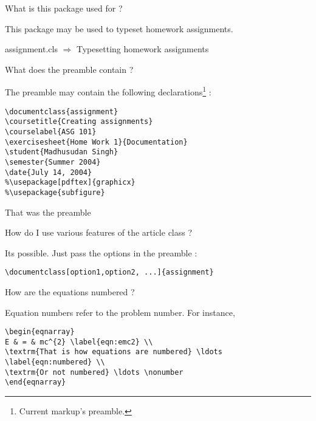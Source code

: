 \documentclass{assignment}
\date{July 14, 2004}
\begin{document}
\begin{problemlist}
\pbitem What is this package used for ?

\begin{problem}

This package may be used to typeset homework assignments.

\begin{answer}
assignment.cls $\Rightarrow$ Typesetting homework assignments
\end{answer}

\end{problem}

\pbitem What does the preamble contain ?
\begin{problem}

The preamble may contain the following declarations\footnote{Current markup's preamble.} :

\begin{verbatim}
\documentclass{assignment}
\coursetitle{Creating assignments}
\courselabel{ASG 101}
\exercisesheet{Home Work 1}{Documentation}
\student{Madhusudan Singh}
\semester{Summer 2004}
\date{July 14, 2004}
%\usepackage[pdftex]{graphicx}
%\usepackage{subfigure}
\end{verbatim}

\begin{answer}
That was the preamble
\end{answer}

\end{problem}

\pbitem How do I use various features of the article class ?

\begin{problem}

Its possible. Just pass the options in the preamble :

\begin{verbatim}
\documentclass[option1,option2, ...]{assignment}
\end{verbatim}

\begin{answer}
\end{answer}

\end{problem}
\pbitem How are the equations numbered ?

\begin{problem}

Equation numbers refer to the problem number. For instance,

\begin{verbatim}
\begin{eqnarray}
E & = & mc^{2} \label{eqn:emc2} \\
\textrm{That is how equations are numbered} \ldots \label{eqn:numbered} \\
\textrm{Or not numbered} \ldots \nonumber
\end{eqnarray}
\end{verbatim}


\end{problem}
\end{problemlist}
\end{document}
